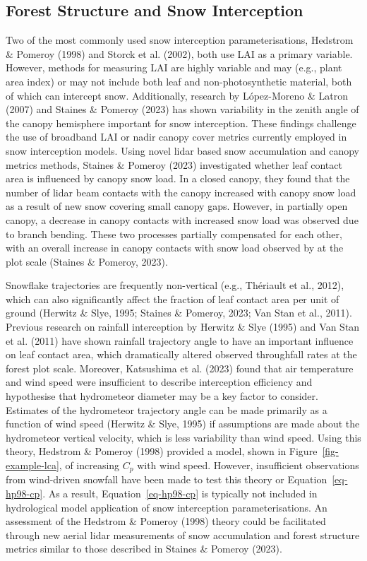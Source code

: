 \documentclass[
  letterpaper,
]{tex/uofsthesis-cs}
\begin{document}
\subsection{Forest Structure and Snow
Interception}\label{forest-structure-and-snow-interception}

Two of the most commonly used snow interception parameterisations,
Hedstrom \& Pomeroy (1998) and Storck et al. (2002), both use LAI as a
primary variable. However, methods for measuring LAI are highly variable
and may (e.g., plant area index) or may not include both leaf and
non-photosynthetic material, both of which can intercept snow.
Additionally, research by López-Moreno \& Latron (2007) and Staines \&
Pomeroy (2023) has shown variability in the zenith angle of the canopy
hemisphere important for snow interception. These findings challenge the
use of broadband LAI or nadir canopy cover metrics currently employed in
snow interception models. Using novel lidar based snow accumulation and
canopy metrics methods, Staines \& Pomeroy (2023) investigated whether
leaf contact area is influenced by canopy snow load. In a closed canopy,
they found that the number of lidar beam contacts with the canopy
increased with canopy snow load as a result of new snow covering small
canopy gaps. However, in partially open canopy, a decrease in canopy
contacts with increased snow load was observed due to branch bending.
These two processes partially compensated for each other, with an
overall increase in canopy contacts with snow load observed by at the
plot scale (Staines \& Pomeroy, 2023).

Snowflake trajectories are frequently non-vertical (e.g., Thériault et
al., 2012), which can also significantly affect the fraction of leaf
contact area per unit of ground (Herwitz \& Slye, 1995; Staines \&
Pomeroy, 2023; Van Stan et al., 2011). Previous research on rainfall
interception by Herwitz \& Slye (1995) and Van Stan et al. (2011) have
shown rainfall trajectory angle to have an important influence on leaf
contact area, which dramatically altered observed throughfall rates at
the forest plot scale. Moreover, Katsushima et al. (2023) found that air
temperature and wind speed were insufficient to describe interception
efficiency and hypothesise that hydrometeor diameter may be a key factor
to consider. Estimates of the hydrometeor trajectory angle can be made
primarily as a function of wind speed (Herwitz \& Slye, 1995) if
assumptions are made about the hydrometeor vertical velocity, which is
less variability than wind speed. Using this theory, Hedstrom \& Pomeroy
(1998) provided a model, shown in Figure~\ref{fig-example-lca}, of
increasing \(C_p\) with wind speed. However, insufficient observations
from wind-driven snowfall have been made to test this theory or
Equation~\ref{eq-hp98-cp}. As a result, Equation~\ref{eq-hp98-cp} is
typically not included in hydrological model application of snow
interception parameterisations. An assessment of the Hedstrom \& Pomeroy
(1998) theory could be facilitated through new aerial lidar measurements
of snow accumulation and forest structure metrics similar to those
described in Staines \& Pomeroy (2023).
\end{document}
